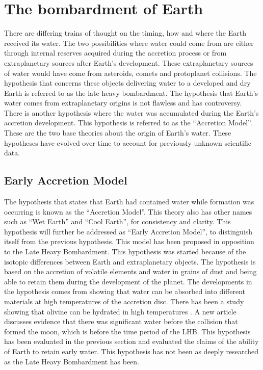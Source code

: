 
\section{\label{chap:bombardment}The bombardment of Earth}
There are differing trains of thought on the timing, how and where the Earth received its water. The two possibilities where water could come from are either through internal reserves acquired during the accretion process or from extraplanetary sources after Earth’s development. These extraplanetary sources of water would have come from asteroids, comets and protoplanet collisions. The hypothesis that concerns these objects delivering water to a developed and dry Earth is referred to as the late heavy bombardment. The hypothesis that Earth’s water comes from extraplanetary origins is not flawless and has controversy. There is another hypothesis where the water was accumulated during the Earth’s accretion development. This hypothesis is referred to as the “Accretion Model”. These are the two base theories about the origin of Earth’s water. These hypotheses have evolved over time to account for previously unknown scientific data.

\subsection{Early Accretion Model}
The hypothesis that states that Earth had contained water while formation was occurring is known as the “Accretion Model”. This theory also has other names such as “Wet Earth” and “Cool Earth”, for consistency and clarity. This hypothesis will further be addressed as “Early Accretion Model”, to distinguish itself from the previous hypothesis. This model has been proposed in opposition to the Late Heavy Bombardment. This hypothesis was started because of the isotopic differences between Earth and extraplanetary objects. The hypothesis is based on the accretion of volatile elements and water in grains of dust and being able to retain them during the development of the planet. The developments in the hypothesis comes from showing that water can be absorbed into different materials at high temperatures of the accretion disc. There has been a study showing that olivine can be hydrated in high temperatures \cite{BOMB11} \cite{BOMB12}. A new article \cite{BOMB13} discusses evidence that there was significant water before the collision that formed the moon, which is before the time period of the LHB. This hypothesis has been evaluated in the previous section and evaluated the claims of the ability of Earth to retain early water. This hypothesis has not been as deeply researched as the Late Heavy Bombardment has been.

